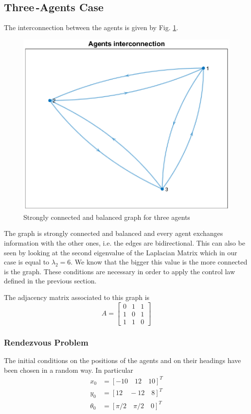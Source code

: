 \documentclass[11pt]{article}
\begin{document}
\subsection*{Three\,-Agents Case}
The interconnection between the agents is given by Fig. \ref{Graph3}.
\begin{figure}[H]
\centering
\includegraphics[width=.6\textwidth]{Images/3Agents/Graph.eps}
\caption{Strongly connected and balanced graph for three agents}
\label{Graph3}
\end{figure}

The graph is strongly connected and balanced and every agent exchanges information with the other ones, i.e. the edges are bidirectional. This can also be seen by looking at the second eigenvalue of the Laplacian Matrix which in our case is equal to $\lambda_2 = 6$. We know that the bigger this value is the more connected is the graph. These conditions are necessary in order to apply the control law defined in the previous section.

The adjacency matrix associated to this graph is 
\begin{equation}
A = 
\begin{bmatrix}
0 & 1 & 1\\
1 & 0 & 1\\
1 & 1 & 0
\end{bmatrix}
\end{equation}
\subsubsection*{Rendezvous Problem}

The initial conditions on the positions of the agents and on their headings have been chosen in a random way. In particular 
\begin{align*}
x_0 &= [-10 \quad 12 \quad 10]^T\\
y_0 &= [12 \quad -12 \quad 8]^T\\
\theta_0 &= [\pi/2 \quad \pi/2 \quad 0]^T
\end{align*}
\end{document}
